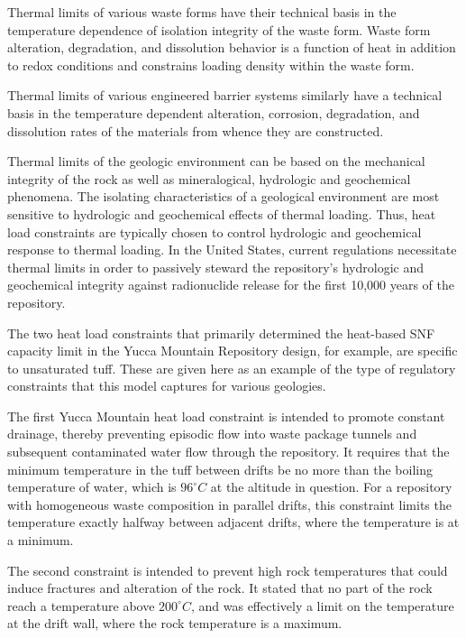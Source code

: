 Thermal limits of various waste forms have their technical basis in the 
temperature dependence of isolation integrity of the waste form. Waste form 
alteration, degradation, and dissolution behavior is a function of heat in 
addition to redox conditions and constrains loading
density within the waste form. 
 
Thermal limits of various engineered barrier systems similarly have a technical 
basis in the temperature dependent alteration, corrosion, degradation, and 
dissolution rates of the materials from whence they are constructed.  

Thermal limits of the geologic environment can be based on the mechanical 
integrity of the rock as well as mineralogical, hydrologic and geochemical 
phenomena. The isolating characteristics of a geological environment are most 
sensitive to hydrologic 
and geochemical effects of thermal loading. Thus, heat load constraints are 
typically chosen to control hydrologic and geochemical response to thermal 
loading. In the United States, current regulations necessitate thermal limits in 
order to passively steward the repository's hydrologic and geochemical integrity 
against radionuclide  release for the first 10,000 years of the repository.

The two heat load constraints that primarily determined the heat-based \gls{SNF} 
capacity limit in the Yucca Mountain Repository design, for example, are 
specific to unsaturated tuff. These are given here as an example of the type of 
regulatory constraints that this model captures for various geologies. 

The first Yucca Mountain heat load constraint is intended to promote constant 
drainage, thereby preventing episodic flow into waste package tunnels and
subsequent contaminated water flow through the repository. It requires that the 
minimum temperature in the tuff between drifts be no  more than the boiling 
temperature of water, which is $96^{\circ}C$ at the altitude in question. For a 
repository with homogeneous waste composition in parallel drifts, this constraint 
limits the temperature exactly halfway between adjacent drifts, where the 
temperature is at a minimum.

The second constraint is intended to prevent high rock temperatures that could 
induce fractures and alteration of the rock. It stated that no part 
of the rock reach a temperature above $200^{\circ}C$, and was effectively a 
limit on the temperature at the drift wall, where the rock temperature is a 
maximum.  

